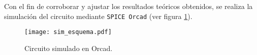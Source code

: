 Con el fin de corroborar y ajustar los resultados teóricos obtenidos, se realiza la simulación del circuito mediante \texttt{SPICE Orcad} (ver figura \ref{fig:sim_esquema}).

\begin{figure}[H]
	\centering
	\texttt{[image: sim\_esquema.pdf]}
	\caption{Circuito simulado en Orcad.}
	\label{fig:sim_esquema}
\end{figure}
